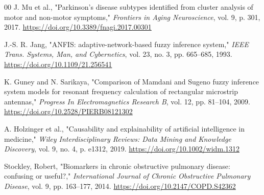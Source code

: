 \documentclass[conference]{IEEEtran}
\begin{document}
\begin{thebibliography}{00}
J. Mu et al., "Parkinson's disease subtypes identified from cluster analysis of motor and non-motor symptoms," \textit{Frontiers in Aging Neuroscience}, vol. 9, p. 301, 2017. \href{https://doi.org/10.3389/fnagi.2017.00301}{https://doi.org/10.3389/fnagi.2017.00301}

J.-S. R. Jang, "ANFIS: adaptive-network-based fuzzy inference system," \textit{IEEE Trans. Systems, Man, and Cybernetics}, vol. 23, no. 3, pp. 665--685, 1993. \href{https://doi.org/10.1109/21.256541}{https://doi.org/10.1109/21.256541}

K. Guney and N. Sarikaya, "Comparison of Mamdani and Sugeno fuzzy inference system models for resonant frequency calculation of rectangular microstrip antennas," \textit{Progress In Electromagnetics Research B}, vol. 12, pp. 81--104, 2009. \href{https://doi.org/10.2528/PIERB08121302}{https://doi.org/10.2528/PIERB08121302}

A. Holzinger et al., "Causability and explainability of artificial intelligence in medicine," \textit{Wiley Interdisciplinary Reviews: Data Mining and Knowledge Discovery}, vol. 9, no. 4, p. e1312, 2019. \href{https://doi.org/10.1002/widm.1312}{https://doi.org/10.1002/widm.1312}

Stockley, Robert, "Biomarkers in chronic obstructive pulmonary disease: confusing or useful?,"
\textit{International Journal of Chronic Obstructive Pulmonary Disease}, vol. 9, pp. 163--177, 2014. \href{https://doi.org/10.2147/COPD.S42362}{https://doi.org/10.2147/COPD.S42362}

\end{thebibliography}
\end{document}
